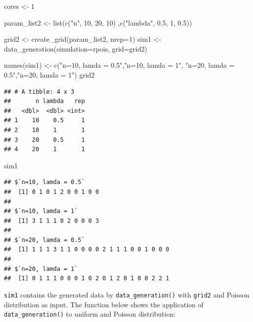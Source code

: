 \documentclass[11pt,a4paper]{article}
\newenvironment{Shaded}{\begin{snugshade}}{\end{snugshade}}
\newcommand{\AttributeTok}[1]{\textcolor[rgb]{0.77,0.63,0.00}{#1}}
\newcommand{\DecValTok}[1]{\textcolor[rgb]{0.00,0.00,0.81}{#1}}
\newcommand{\FloatTok}[1]{\textcolor[rgb]{0.00,0.00,0.81}{#1}}
\newcommand{\FunctionTok}[1]{\textcolor[rgb]{0.00,0.00,0.00}{#1}}
\newcommand{\NormalTok}[1]{#1}
\newcommand{\OtherTok}[1]{\textcolor[rgb]{0.56,0.35,0.01}{#1}}
\newcommand{\StringTok}[1]{\textcolor[rgb]{0.31,0.60,0.02}{#1}}
\begin{document}
\begin{Shaded}
\begin{Highlighting}[]
\NormalTok{cores }\OtherTok{\textless{}{-}} \DecValTok{1}


\NormalTok{param\_list2 }\OtherTok{\textless{}{-}} \FunctionTok{list}\NormalTok{(}\FunctionTok{c}\NormalTok{(}\StringTok{"n"}\NormalTok{, }\DecValTok{10}\NormalTok{, }\DecValTok{20}\NormalTok{, }\DecValTok{10}\NormalTok{)}
\NormalTok{                  ,}\FunctionTok{c}\NormalTok{(}\StringTok{"lambda"}\NormalTok{, }\FloatTok{0.5}\NormalTok{, }\DecValTok{1}\NormalTok{, }\FloatTok{0.5}\NormalTok{))}



\NormalTok{grid2 }\OtherTok{\textless{}{-}} \FunctionTok{create\_grid}\NormalTok{(param\_list2, }\AttributeTok{nrep=}\DecValTok{1}\NormalTok{)}
\NormalTok{sim1 }\OtherTok{\textless{}{-}} \FunctionTok{data\_generation}\NormalTok{(}\AttributeTok{simulation=}\NormalTok{rpois, }\AttributeTok{grid=}\NormalTok{grid2)}


\FunctionTok{names}\NormalTok{(sim1) }\OtherTok{\textless{}{-}} \FunctionTok{c}\NormalTok{(}\StringTok{"n=10, lamda = 0.5"}\NormalTok{,}\StringTok{"n=10, lamda = 1"}\NormalTok{,}
                 \StringTok{"n=20, lamda = 0.5"}\NormalTok{,}\StringTok{"n=20, lamda = 1"}\NormalTok{)}
\NormalTok{grid2}
\end{Highlighting}
\end{Shaded}

\begin{verbatim}
## # A tibble: 4 x 3
##       n lambda   rep
##   <dbl>  <dbl> <int>
## 1    10    0.5     1
## 2    10    1       1
## 3    20    0.5     1
## 4    20    1       1
\end{verbatim}

\begin{Shaded}
\begin{Highlighting}[]
\NormalTok{sim1}
\end{Highlighting}
\end{Shaded}

\begin{verbatim}
## $`n=10, lamda = 0.5`
##  [1] 0 1 0 1 2 0 0 1 0 0
## 
## $`n=10, lamda = 1`
##  [1] 3 1 1 1 0 2 0 0 0 3
## 
## $`n=20, lamda = 0.5`
##  [1] 1 1 1 3 1 1 0 0 0 0 2 1 1 1 0 0 1 0 0 0
## 
## $`n=20, lamda = 1`
##  [1] 0 1 1 1 0 0 0 1 0 2 0 1 2 0 1 0 0 2 2 1
\end{verbatim}

\texttt{sim1} contains the generated data by \texttt{data\_generation()}
with \texttt{grid2} and Poisson distribution as input. The function
below shows the application of \texttt{data\_generation()} to uniform
and Poisson distribution:
\end{document}
